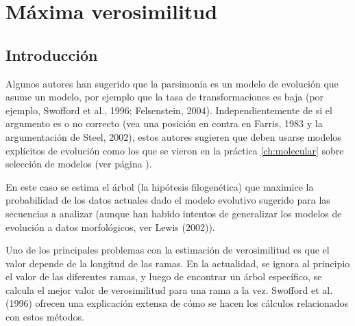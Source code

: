 \chapter{M\'axima verosimilitud}
\section*{Introducci\'on}
\label{ch:likelihood}

Algunos autores han sugerido que la parsimonia es un modelo de evoluci\'on que asume un modelo, por ejemplo que la tasa de transformaciones es baja (por ejemplo, Swofford et al., 1996; Felsenstein, 2004). Independientemente de si el argumento es o no correcto (vea una posici\'on en contra en Farris, 1983 y la argumentaci\'on de Steel, 2002), estos autores sugieren que deben usarse modelos expl\'icitos de evoluci\'on como los que se vieron en la pr\'actica \ref{ch:molecular} sobre selecci\'on de modelos (ver p\'agina \pageref{ch:molecular}).


En este caso se estima el \'arbol (la hip\'otesis filogen\'etica) que maximice la probabilidad de los datos actuales dado el modelo evolutivo sugerido para las secuencias a analizar (aunque han habido intentos de generalizar los modelos de evoluci\'on a datos morfol\'ogicos, ver  Lewis (2002)).

Uno de los principales problemas con la estimaci\'on de verosimilitud es que el valor depende de la longitud de las ramas. En la actualidad, se ignora al principio el valor de las diferentes ramas, y luego de encontrar un \'arbol espec\'ifico, se calcula el mejor valor de verosimilitud para una rama a la vez. Swofford et al. (1996) ofrecen una explicaci\'on extensa de c\'omo se hacen los c\'alculos relacionados con estos m\'etodos.

